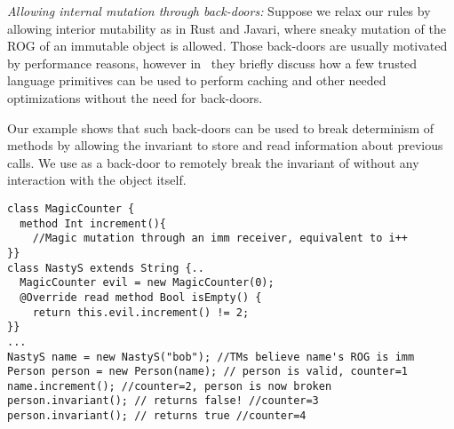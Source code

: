 \textit{Allowing internal mutation through back-doors:}
Suppose we relax our rules by allowing interior mutability
as in Rust and Javari, where sneaky mutation
of the ROG of an immutable object is allowed.
Those back-doors are usually motivated by performance reasons, however in~\cite{GordonEtAl12} they
briefly discuss how a few trusted language primitives can be used to perform caching and other needed optimizations
without the need for back-doors.

Our example shows that such back-doors can be used to break determinism of  \Q@invariant@ methods by allowing the invariant to store and read information about previous calls. We use \Q@MagicCounter@ as a back-door to remotely break the invariant of \Q@person@ without any interaction with the \Q@person@ object itself.

\begin{lstlisting}
class MagicCounter {
  method Int increment(){
    //Magic mutation through an imm receiver, equivalent to i++
}}
class NastyS extends String {..
  MagicCounter evil = new MagicCounter(0);
  @Override read method Bool isEmpty() {
    return this.evil.increment() != 2; 
}}
...
NastyS name = new NastyS("bob"); //TMs believe name's ROG is imm
Person person = new Person(name); // person is valid, counter=1
name.increment(); //counter=2, person is now broken
person.invariant(); // returns false! //counter=3
person.invariant(); // returns true //counter=4
\end{lstlisting}


